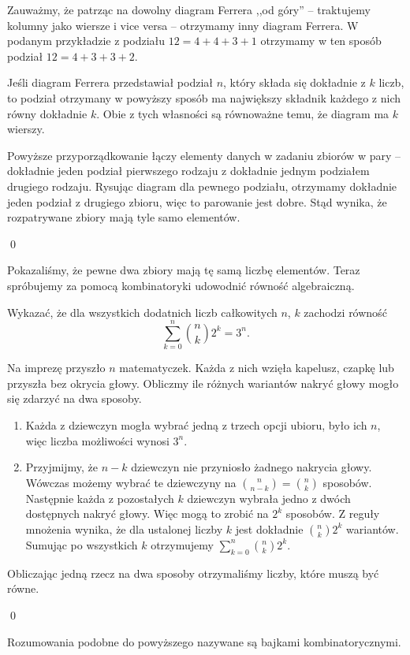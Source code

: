\vspace{10px}
\noindent
Zauważmy, że patrząc na dowolny diagram Ferrera ,,od góry'' -- traktujemy kolumny jako wiersze i vice versa -- otrzymamy inny diagram Ferrera. W podanym przykładzie z podziału $12 = 4 + 4 + 3 + 1$ otrzymamy w ten sposób podział $12 = 4 + 3 + 3 + 2$.

\vspace{10px}
\noindent
Jeśli diagram Ferrera przedstawiał podział $n$, który składa się dokładnie z $k$ liczb, to podział otrzymany w powyższy sposób ma największy składnik każdego z nich równy dokładnie $k$. Obie z tych własności są równoważne temu, że diagram ma $k$ wierszy.

\vspace{10px}
\noindent
Powyższe przyporządkowanie łączy elementy danych w zadaniu zbiorów w pary -- dokładnie jeden podział pierwszego rodzaju z dokładnie jednym podziałem drugiego rodzaju. Rysując diagram dla pewnego podziału, otrzymamy dokładnie jeden podział z drugiego zbioru, więc to parowanie jest dobre. Stąd wynika, że rozpatrywane zbiory mają tyle samo elementów.

\qed

\vspace{10px}

\noindent
Pokazaliśmy, że pewne dwa zbiory mają tę samą liczbę elementów. Teraz spróbujemy za pomocą kombinatoryki udowodnić równość algebraiczną.

\vspace{5px}



\noindent
Wykazać, że dla wszystkich dodatnich liczb całkowitych $n$, $k$ zachodzi równość
\[
    \sum^{n}_{k=0} {{n}\choose{k}} 2^k = 3^n.
\]

\vspace{5px}


\vspace{5px}

\noindent
Na imprezę przyszło $n$ matematyczek. Każda z nich wzięła kapelusz, czapkę lub przyszła bez okrycia głowy. Obliczmy ile różnych wariantów nakryć głowy mogło się zdarzyć na dwa sposoby.
\begin{enumerate}
    \item Każda z dziewczyn mogła wybrać jedną z trzech opcji ubioru, było ich $n$, więc liczba możliwości wynosi $3^n$.
    \item Przyjmijmy, że $n - k$ dziewczyn nie przyniosło żadnego nakrycia głowy. 
    Wówczas możemy wybrać te dziewczyny na ${{n}\choose{n - k}} = {{n}\choose{k}}$ sposobów. 
    Następnie każda z pozostałych $k$ dziewczyn wybrała jedno z dwóch dostępnych nakryć głowy. 
    Więc mogą to zrobić na $2^k$ sposobów. Z reguły mnożenia wynika, że dla ustalonej liczby $k$ jest dokładnie ${{n}\choose{k}} 2^k$ wariantów. Sumując po wszystkich $k$ otrzymujemy $\sum^{n}_{k=0} {{n}\choose{k}} 2^k$.
\end{enumerate}

\noindent
Obliczając jedną rzecz na dwa sposoby otrzymaliśmy liczby, które muszą być równe.

\qed

\vspace{10px}

\noindent
Rozumowania podobne do powyższego nazywane są bajkami kombinatorycznymi.

\vspace{10px}
